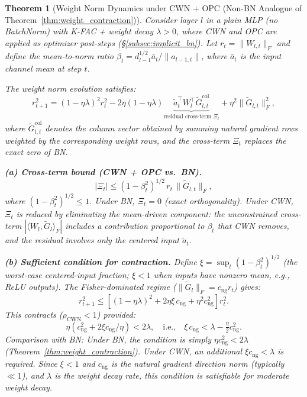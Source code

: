 \documentclass{article}
\providecommand{\norm}[1]{\lVert #1 \rVert}
\theoremstyle{plain}
\newtheorem{theorem}{Theorem}
\theoremstyle{definition}
\theoremstyle{remark}
\begin{document}
\begin{theorem}[Weight Norm Dynamics under CWN + OPC (Non-BN Analogue of Theorem~\ref{thm:weight_contraction})]
\label{thm:cwn_opc_contraction}
Consider layer $l$ in a plain MLP (no BatchNorm) with K-FAC + weight decay $\lambda > 0$, where CWN and OPC are applied as optimizer post-steps (\S\ref{subsec:implicit_bn}). Let $r_t = \norm{W_{l,t}}_F$ and define the \emph{mean-to-norm ratio} $\beta_t = d_{l-1}^{1/2}\bar{a}_t/\norm{a_{l-1,t}}$, where $\bar{a}_t$ is the input channel mean at step $t$.

The weight norm evolution satisfies:
\begin{equation}
\label{eq:cwn_opc_norm_evolution}
    r_{t+1}^2 = (1-\eta\lambda)^2 r_t^2 - 2\eta(1-\eta\lambda)\underbrace{\tilde{a}_t^\top W_l^\top \tilde{G}_{l,t}^{\mathrm{col}}}_{\text{residual cross-term }\Xi_t} + \eta^2\norm{\tilde{G}_{l,t}}_F^2,
\end{equation}
where $\tilde{G}_{l,t}^{\mathrm{col}}$ denotes the column vector obtained by summing natural gradient rows weighted by the corresponding weight rows, and the cross-term $\Xi_t$ replaces the exact zero of BN.

\textbf{(a) Cross-term bound (CWN + OPC vs.\ BN).}
\begin{equation}
\label{eq:cross_term_bound}
    |\Xi_t| \leq (1-\beta_t^2)^{1/2}\,r_t\,\norm{\tilde{G}_{l,t}}_F,
\end{equation}
where $(1-\beta_t^2)^{1/2} \leq 1$. Under BN, $\Xi_t = 0$ (exact orthogonality). Under CWN, $\Xi_t$ is reduced by eliminating the mean-driven component: the unconstrained cross-term $|\langle W_l, \tilde{G}_l\rangle_F|$ includes a contribution proportional to $\beta_t$ that CWN removes, and the residual involves only the centered input $\tilde{a}_t$.

\textbf{(b) Sufficient condition for contraction.} Define $\xi = \sup_t (1-\beta_t^2)^{1/2}$ (the worst-case centered-input fraction; $\xi < 1$ when inputs have nonzero mean, e.g., ReLU outputs). The Fisher-dominated regime ($\norm{\tilde{G}_l}_F = c_{\mathrm{ng}} r_t$) gives:
\begin{equation}
\label{eq:cwn_contraction_condition}
    r_{t+1}^2 \leq \left[(1-\eta\lambda)^2 + 2\eta\xi\, c_{\mathrm{ng}} + \eta^2 c_{\mathrm{ng}}^2\right] r_t^2.
\end{equation}
This contracts ($\rho_{\mathrm{CWN}} < 1$) provided:
\begin{equation}
\label{eq:cwn_contraction_eta}
    \eta(c_{\mathrm{ng}}^2 + 2\xi c_{\mathrm{ng}}/\eta) < 2\lambda, \quad\text{i.e.,}\quad \xi\,c_{\mathrm{ng}} < \lambda - \tfrac{\eta}{2}c_{\mathrm{ng}}^2.
\end{equation}
\emph{Comparison with BN:} Under BN, the condition is simply $\eta c_{\mathrm{ng}}^2 < 2\lambda$ (Theorem~\ref{thm:weight_contraction}). Under CWN, an additional $\xi c_{\mathrm{ng}} < \lambda$ is required. Since $\xi < 1$ and $c_{\mathrm{ng}}$ is the natural gradient direction norm (typically $\ll 1$), and $\lambda$ is the weight decay rate, this condition is satisfiable for moderate weight decay.


\end{theorem}
\end{document}
